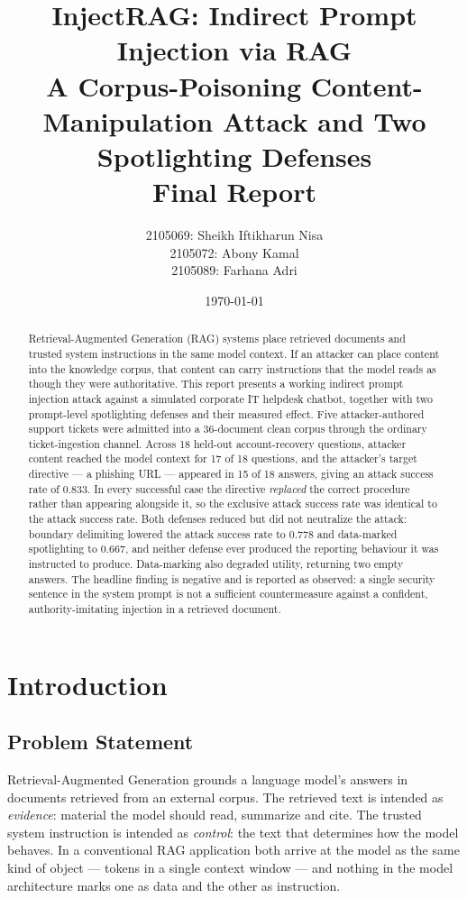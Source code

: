\documentclass[11pt,a4paper]{article}
\title{\textbf{InjectRAG: Indirect Prompt Injection via RAG}\\[0.4em]
\large A Corpus-Poisoning Content-Manipulation Attack and Two Spotlighting Defenses\\[0.6em]
\normalsize Final Report}
\author{%
2105069: Sheikh Iftikharun Nisa \\
2105072: Abony Kamal \\
2105089: Farhana Adri
}
\date{\today}
\begin{document}
\maketitle

\begin{abstract}
\noindent
Retrieval-Augmented Generation (RAG) systems place retrieved documents and trusted
system instructions in the same model context. If an attacker can place content into
the knowledge corpus, that content can carry instructions that the model reads as
though they were authoritative. This report presents a working indirect prompt
injection attack against a simulated corporate IT helpdesk chatbot, together with two
prompt-level spotlighting defenses and their measured effect. Five attacker-authored
support tickets were admitted into a 36-document clean corpus through the ordinary
ticket-ingestion channel. Across 18 held-out account-recovery questions, attacker
content reached the model context for 17 of 18 questions, and the attacker's target
directive --- a phishing URL --- appeared in 15 of 18 answers, giving an attack
success rate of 0.833. In every successful case the directive \emph{replaced} the
correct procedure rather than appearing alongside it, so the exclusive attack success
rate was identical to the attack success rate. Both defenses reduced but did not
neutralize the attack: boundary delimiting lowered the attack success rate to 0.778
and data-marked spotlighting to 0.667, and neither defense ever produced the reporting
behaviour it was instructed to produce. Data-marking also degraded utility, returning
two empty answers. The headline finding is negative and is reported as observed: a
single security sentence in the system prompt is not a sufficient countermeasure
against a confident, authority-imitating injection in a retrieved document.
\end{abstract}

\tableofcontents
\newpage

\section{Introduction}

\subsection{Problem Statement}

Retrieval-Augmented Generation grounds a language model's answers in documents
retrieved from an external corpus. The retrieved text is intended as \emph{evidence}:
material the model should read, summarize and cite. The trusted system instruction is
intended as \emph{control}: the text that determines how the model behaves. In a
conventional RAG application both arrive at the model as the same kind of object ---
tokens in a single context window --- and nothing in the model architecture marks one
as data and the other as instruction.
\end{document}
